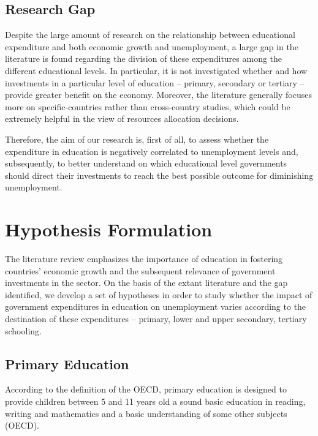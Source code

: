 \documentclass[
]{article}
\begin{document}
\hypertarget{research-gap}{%
\subsection{Research Gap}\label{research-gap}}

Despite the large amount of research on the relationship between
educational expenditure and both economic growth and unemployment, a
large gap in the literature is found regarding the division of these
expenditures among the different educational levels. In particular, it
is not investigated whether and how investments in a particular level of
education -- primary, secondary or tertiary -- provide greater benefit
on the economy. Moreover, the literature generally focuses more on
specific-countries rather than cross-country studies, which could be
extremely helpful in the view of resources allocation decisions.

Therefore, the aim of our research is, first of all, to assess whether
the expenditure in education is negatively correlated to unemployment
levels and, subsequently, to better understand on which educational
level governments should direct their investments to reach the best
possible outcome for diminishing unemployment.

\hypertarget{hypothesis-formulation}{%
\section{Hypothesis Formulation}\label{hypothesis-formulation}}

The literature review emphasizes the importance of education in
fostering countries' economic growth and the subsequent relevance of
government investments in the sector. On the basis of the extant
literature and the gap identified, we develop a set of hypotheses in
order to study whether the impact of government expenditures in
education on unemployment varies according to the destination of these
expenditures -- primary, lower and upper secondary, tertiary schooling.

\hypertarget{primary-education}{%
\subsection{Primary Education}\label{primary-education}}

According to the definition of the OECD, primary education is designed
to provide children between 5 and 11 years old a sound basic education
in reading, writing and mathematics and a basic understanding of some
other subjects (OECD).
\end{document}
